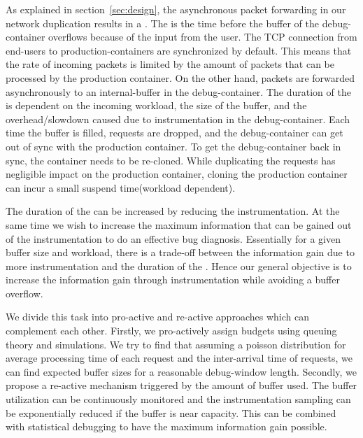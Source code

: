 As explained in section~\ref{sec:design}, the asynchronous packet forwarding in our network duplication results in a \debugwindow.
The \debugwindow is the time before the buffer of the debug-container overflows because of the input from the user.
The TCP connection from end-users to production-containers are synchronized by default.
This means that the rate of incoming packets is limited by the amount of packets that can be processed by the production container.
On the other hand, packets are forwarded asynchronously to an internal-buffer in the debug-container.
The duration of the \debugwindow is dependent on the incoming workload, the size of the buffer, and the overhead/slowdown caused due to instrumentation in the debug-container.
Each time the buffer is filled, requests are dropped, and the debug-container can get out of sync with the production container.
To get the debug-container back in sync, the container needs to be re-cloned.
While duplicating the requests has negligible impact on the production container, cloning the production container can incur a small suspend time(workload dependent).

The duration of the \debugwindow can be increased by reducing the instrumentation.
At the same time we wish to increase the maximum information that can be gained out of the instrumentation to do an effective bug diagnosis.
Essentially for a given buffer size and workload, there is a trade-off between the information gain due to more instrumentation and the duration of the \debugwindow.
Hence our general objective is to increase the information gain through instrumentation while avoiding a buffer overflow.

We divide this task into  pro-active and re-active approaches which can complement each other. Firstly, we pro-actively assign budgets using queuing theory and simulations. We try to find that assuming a poisson distribution for average processing time of each request and the inter-arrival time of requests, we can find expected buffer sizes for a reasonable debug-window length. Secondly, we propose a re-active mechanism triggered by the amount of buffer used. The buffer utilization can be continuously monitored and the instrumentation sampling can be exponentially reduced if the buffer is near capacity. This can be combined with statistical debugging to have the maximum information gain possible. 

